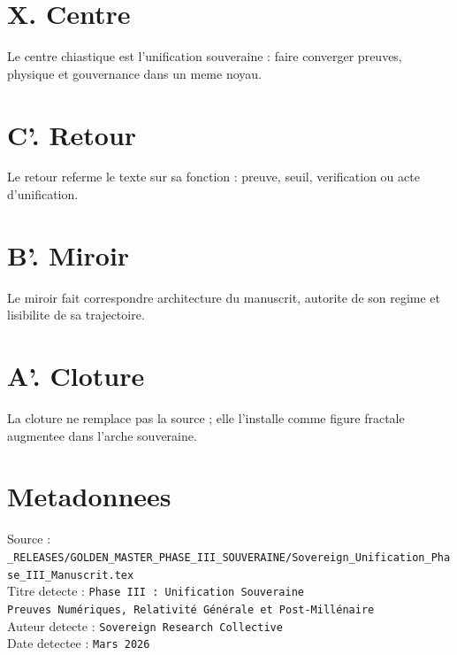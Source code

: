 \documentclass[11pt,a4paper]{article}
\begin{document}
\section*{X. Centre}
Le centre chiastique est l'unification souveraine : faire converger preuves, physique et gouvernance dans un meme noyau.

\section*{C'. Retour}
Le retour referme le texte sur sa fonction : preuve, seuil, verification ou acte d'unification.

\section*{B'. Miroir}
Le miroir fait correspondre architecture du manuscrit, autorite de son regime et lisibilite de sa trajectoire.

\section*{A'. Cloture}
La cloture ne remplace pas la source ; elle l'installe comme figure fractale augmentee dans l'arche souveraine.

\section*{Metadonnees}
Source : \texttt{_RELEASES/GOLDEN_MASTER_PHASE_III_SOUVERAINE/Sovereign_Unification_Phase_III_Manuscrit.tex}\\
Titre detecte : \texttt{Phase III : Unification Souveraine \\ Preuves Numériques, Relativité Générale et Post-Millénaire}\\
Auteur detecte : \texttt{Sovereign Research Collective}\\
Date detectee : \texttt{Mars 2026}
\end{document}
